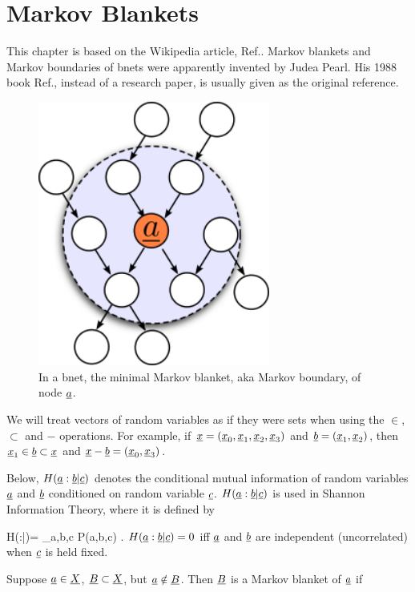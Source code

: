 \chapter{Markov Blankets}\label{ch-mblanket}


This chapter is based on the
Wikipedia article, 
Ref.\cite{wiki-mblanket}.
Markov blankets
and Markov boundaries of bnets
were apparently invented
by Judea Pearl. His 1988 book
 Ref.\cite{Pearl-mblanket}, 
instead of a research paper, is 
usually given as the original reference.

\begin{figure}[h!]
\centering
\includegraphics[width=3in]{mblanket/mblanket.png}
\caption{In a bnet,
the minimal Markov blanket,
aka Markov boundary,
of node ${\underline{a}}$.} 
\label{fig-mblanket}
\end{figure}

We will treat vectors 
of random variables as if
they were sets when using the $\in$,
$\subset$ and $-$ operations.
For example,
if ${\underline{x}}=({\underline{x}}_0, 
{\underline{x}}_1, {\underline{x}}_2,
{\underline{x}}_3)$ and
${\underline{b}}=({\underline{x}}_1, {\underline{x}}_2)$,
then ${\underline{x}}_1\in {\underline{b}}\subset {\underline{x}}$ and
${\underline{x}}-{\underline{b}}=({\underline{x}}_0, {\underline{x}}_3)$.

Below, $H({\underline{a}}:{\underline{b}}|{\underline{c}})$
denotes the conditional
mutual information of
random variables
${\underline{a}}$ and ${\underline{b}}$
conditioned on 
random variable ${\underline{c}}$.
$H({\underline{a}}:{\underline{b}}|{\underline{c}})$
is used in Shannon Information
Theory, where it is defined by

\beq
H(\rva:\rvb|\rvc)=
\sum_{a,b,c}
P(a,b,c)\ln 
{}
\;.
\eeq
$H({\underline{a}}:{\underline{b}}|{\underline{c}})=0$
iff ${\underline{a}}$ and ${\underline{b}}$
are independent (uncorrelated)
when ${\underline{c}}$ is held fixed.



Suppose
${\underline{a}}\in  {\underline{X}}$,
 ${\underline{B}}\subset {\underline{X}}$,
but ${\underline{a}}\notin{\underline{B}}$.
Then ${\underline{B}}$ is a Markov blanket
of ${\underline{a}}$ if

